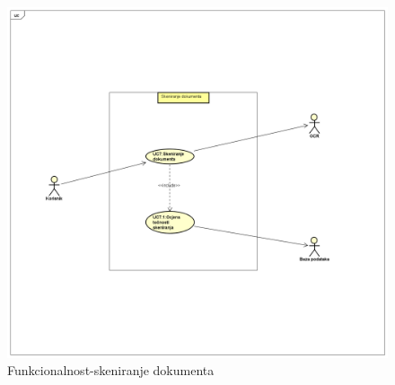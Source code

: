 \documentclass{article} %
\begin{document}
\begin{figure}
	\includegraphics[width=\linewidth]{Aplikacija za digitalizaciju-skeniranje dokumenta.png}
	\caption{Funkcionalnost-skeniranje dokumenta}
\end{figure}
\end{document}
